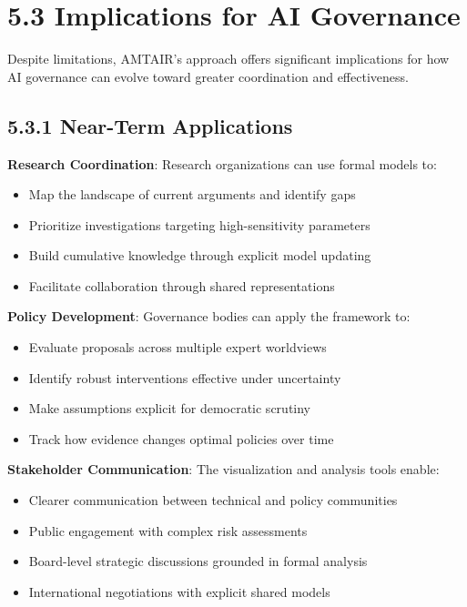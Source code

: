 \documentclass[
  11pt,
  letterpaper,
  openany]{book}
\providecommand{\tightlist}{%
  \setlength{\itemsep}{0pt}\setlength{\parskip}{0pt}}
\begin{document}
\section{5.3 Implications for AI
Governance}\label{sec-governance-implications}

Despite limitations, AMTAIR's approach offers significant implications
for how AI governance can evolve toward greater coordination and
effectiveness.

\subsection{5.3.1 Near-Term
Applications}\label{sec-near-term-applications}

\textbf{Research Coordination}: Research organizations can use formal
models to:

\begin{itemize}
\tightlist
\item
  Map the landscape of current arguments and identify gaps
\item
  Prioritize investigations targeting high-sensitivity parameters
\item
  Build cumulative knowledge through explicit model updating
\item
  Facilitate collaboration through shared representations
\end{itemize}

\textbf{Policy Development}: Governance bodies can apply the framework
to:

\begin{itemize}
\tightlist
\item
  Evaluate proposals across multiple expert worldviews
\item
  Identify robust interventions effective under uncertainty
\item
  Make assumptions explicit for democratic scrutiny
\item
  Track how evidence changes optimal policies over time
\end{itemize}

\textbf{Stakeholder Communication}: The visualization and analysis tools
enable:

\begin{itemize}
\tightlist
\item
  Clearer communication between technical and policy communities
\item
  Public engagement with complex risk assessments
\item
  Board-level strategic discussions grounded in formal analysis
\item
  International negotiations with explicit shared models
\end{itemize}
\end{document}
